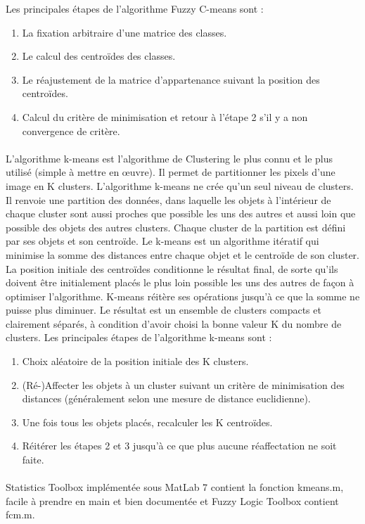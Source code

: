 Les principales étapes de l’algorithme Fuzzy C-means sont :
\begin{enumerate}
\item La fixation arbitraire d’une matrice des classes.
\item Le calcul des centroïdes des classes.
\item Le réajustement de la matrice d’appartenance suivant la position des centroïdes.
\item Calcul du critère de minimisation et retour à l’étape 2 s’il y a non convergence de critère.
\end{enumerate}
\paragraph{}
L’algorithme k-means est l’algorithme de Clustering le plus connu et le plus utilisé (simple à mettre en œuvre). Il permet de partitionner les pixels d’une image en K clusters. L’algorithme k-means ne crée qu’un seul niveau de clusters. Il renvoie une partition des données, dans laquelle les objets à l’intérieur de chaque cluster sont aussi proches que possible les uns des autres et aussi loin que possible des objets des autres clusters. Chaque cluster de la partition est défini par ses objets et son centroïde. Le k-means est un algorithme itératif qui minimise la somme des distances entre chaque objet et le centroïde de son cluster. La position initiale des centroïdes conditionne le résultat final, de sorte qu'ils doivent être initialement placés le plus loin possible les uns des autres de façon à optimiser l’algorithme. K-means réitère ses opérations jusqu’à ce que la somme ne puisse plus diminuer. Le résultat est un ensemble de clusters compacts et clairement séparés, à condition d’avoir choisi la bonne valeur K du nombre de clusters. Les principales étapes de l’algorithme k-means sont :
\begin{enumerate}
\item Choix aléatoire de la position initiale des K clusters.
\item (Ré-)Affecter les objets à un cluster suivant un critère de minimisation des distances (généralement selon une mesure de distance euclidienne).
\item Une fois tous les objets placés, recalculer les K centroïdes.
\item Réitérer les étapes 2 et 3 jusqu’à ce que plus aucune réaffectation ne soit faite.
\end{enumerate}
\paragraph{}
Statistics Toolbox implémentée sous MatLab 7 contient la fonction kmeans.m, facile à prendre en main et bien documentée et Fuzzy Logic Toolbox contient fcm.m.

